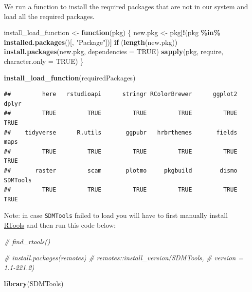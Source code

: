 \documentclass[
]{book}
\newenvironment{Shaded}{\begin{snugshade}}{\end{snugshade}}
\newcommand{\AttributeTok}[1]{\textcolor[rgb]{0.13,0.29,0.53}{#1}}
\newcommand{\CommentTok}[1]{\textcolor[rgb]{0.56,0.35,0.01}{\textit{#1}}}
\newcommand{\ConstantTok}[1]{\textcolor[rgb]{0.56,0.35,0.01}{#1}}
\newcommand{\ControlFlowTok}[1]{\textcolor[rgb]{0.13,0.29,0.53}{\textbf{#1}}}
\newcommand{\FunctionTok}[1]{\textcolor[rgb]{0.13,0.29,0.53}{\textbf{#1}}}
\newcommand{\NormalTok}[1]{#1}
\newcommand{\OtherTok}[1]{\textcolor[rgb]{0.56,0.35,0.01}{#1}}
\newcommand{\SpecialCharTok}[1]{\textcolor[rgb]{0.81,0.36,0.00}{\textbf{#1}}}
\newcommand{\StringTok}[1]{\textcolor[rgb]{0.31,0.60,0.02}{#1}}
\begin{document}
We run a function to install the required packages that are not in our system and load all the required packages.

\begin{Shaded}
\begin{Highlighting}[]
\NormalTok{install\_load\_function }\OtherTok{\textless{}{-}} \ControlFlowTok{function}\NormalTok{(pkg) \{}
\NormalTok{    new.pkg }\OtherTok{\textless{}{-}}\NormalTok{ pkg[}\SpecialCharTok{!}\NormalTok{(pkg }\SpecialCharTok{\%in\%} \FunctionTok{installed.packages}\NormalTok{()[,}
        \StringTok{"Package"}\NormalTok{])]}
    \ControlFlowTok{if}\NormalTok{ (}\FunctionTok{length}\NormalTok{(new.pkg))}
        \FunctionTok{install.packages}\NormalTok{(new.pkg, }\AttributeTok{dependencies =} \ConstantTok{TRUE}\NormalTok{)}
    \FunctionTok{sapply}\NormalTok{(pkg, require, }\AttributeTok{character.only =} \ConstantTok{TRUE}\NormalTok{)}
\NormalTok{\}}

\FunctionTok{install\_load\_function}\NormalTok{(requiredPackages)}
\end{Highlighting}
\end{Shaded}

\begin{verbatim}
##         here   rstudioapi      stringr RColorBrewer      ggplot2        dplyr 
##         TRUE         TRUE         TRUE         TRUE         TRUE         TRUE 
##    tidyverse      R.utils       ggpubr   hrbrthemes       fields         maps 
##         TRUE         TRUE         TRUE         TRUE         TRUE         TRUE 
##       raster         scam       plotmo     pkgbuild        dismo     SDMTools 
##         TRUE         TRUE         TRUE         TRUE         TRUE         TRUE
\end{verbatim}

Note: in case \texttt{SDMTools} failed to load you will have to first manually install \href{https://cran.r-project.org/bin/windows/Rtools/history.html}{RTools} and then run this code below:

\begin{Shaded}
\begin{Highlighting}[]
\CommentTok{\# find\_rtools()}

\CommentTok{\# install.packages(\textquotesingle{}remotes\textquotesingle{})}
\CommentTok{\# remotes::install\_version(\textquotesingle{}SDMTools\textquotesingle{},}
\CommentTok{\# version = \textquotesingle{}1.1{-}221.2\textquotesingle{})}

\FunctionTok{library}\NormalTok{(SDMTools)}
\end{Highlighting}
\end{Shaded}
\end{document}
